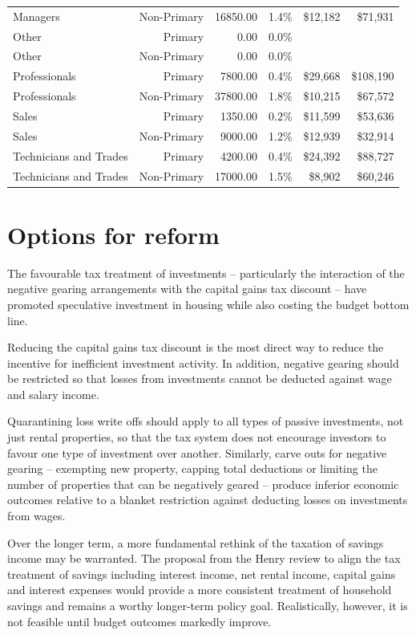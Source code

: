\documentclass{grattan}\usepackage[]{graphicx}\usepackage[]{color}
\begin{document}
\begin{table}
\begin{tabular}{lrrrrr}
  Managers & Non-Primary & 16850.00 & 1.4\% & \$12,182 & \$71,931 \\ 
   [6pt]Other & Primary & 0.00 & 0.0\% &  &  \\ 
  Other & Non-Primary & 0.00 & 0.0\% &  &  \\ 
   [6pt]Professionals & Primary & 7800.00 & 0.4\% & \$29,668 & \$108,190 \\ 
  Professionals & Non-Primary & 37800.00 & 1.8\% & \$10,215 & \$67,572 \\ 
   [6pt]Sales & Primary & 1350.00 & 0.2\% & \$11,599 & \$53,636 \\ 
  Sales & Non-Primary & 9000.00 & 1.2\% & \$12,939 & \$32,914 \\ 
   [6pt]Technicians and Trades & Primary & 4200.00 & 0.4\% & \$24,392 & \$88,727 \\ 
  Technicians and Trades & Non-Primary & 17000.00 & 1.5\% & \$8,902 & \$60,246 \\ 
   \bottomrule
\end{tabular}

\end{table}

\chapter{Options for reform}
The favourable tax treatment of investments -- particularly the interaction of the negative gearing arrangements with the capital gains tax discount -- have promoted speculative investment in housing while also costing the budget bottom line. 

Reducing the capital gains tax discount is the most direct way to reduce the incentive for inefficient investment activity. In addition, negative gearing should be restricted so that losses from investments cannot be deducted against wage and salary income. 

Quarantining loss write offs should apply to all types of passive investments, not just rental properties, so that the tax system does not encourage investors to favour one type of investment over another. Similarly, carve outs for negative gearing -- exempting new property, capping total deductions or limiting the number of properties that can be negatively geared -- produce inferior economic outcomes relative to a blanket restriction against deducting losses on investments from wages.

Over the longer term, a more fundamental rethink of the taxation of savings income may be warranted. The proposal from the Henry review to align the tax treatment of savings including interest income, net rental income, capital gains and interest expenses would provide a more consistent treatment of household savings and remains a worthy longer-term policy goal.  Realistically, however, it is not feasible until budget outcomes markedly improve.
\end{document}
